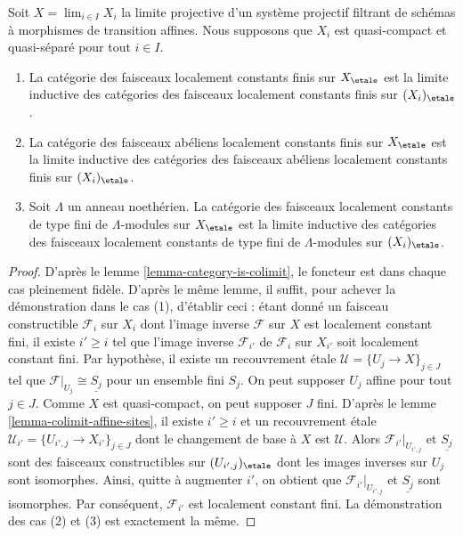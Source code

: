 \begin{lemma}
\label{lemma-category-loc-cst-is-colimit}
Soit $X = \lim_{i \in I} X_i$ la limite projective d'un système
projectif filtrant de schémas à morphismes de transition affines.
Nous supposons que $X_i$ est quasi-compact et quasi-séparé
pour tout $i \in I$.
\begin{enumerate}
\item La catégorie des faisceaux localement constants finis sur $X_\etale$
est la limite inductive des catégories des faisceaux localement constants finis
sur $(X_i)_\etale$.
\item La catégorie des faisceaux abéliens localement constants finis sur $X_\etale$
est la limite inductive des catégories des faisceaux abéliens localement constants finis
sur $(X_i)_\etale$.
\item Soit $\Lambda$ un anneau noethérien. La catégorie des faisceaux
localement constants de type fini de $\Lambda$-modules sur $X_\etale$
est la limite inductive des catégories des faisceaux localement constants
de type fini de $\Lambda$-modules sur $(X_i)_\etale$.
\end{enumerate}
\end{lemma}

\begin{proof}
D'après le lemme \ref{lemma-category-is-colimit}, le foncteur est dans chaque cas
pleinement fidèle. D'après le même lemme, il suffit, pour achever
la démonstration dans le cas (1), d'établir ceci : étant donné un faisceau constructible
$\mathcal{F}_i$ sur $X_i$ dont l'image inverse $\mathcal{F}$ sur $X$ est
localement constant fini, il existe $i' \geq i$ tel que
l'image inverse $\mathcal{F}_{i'}$ de $\mathcal{F}_i$ sur $X_{i'}$
soit localement constant fini. Par hypothèse, il existe un recouvrement \'etale
$\mathcal{U} = \{U_j \to X\}_{j \in J}$
tel que $\mathcal{F}|_{U_j} \cong \underline{S_j}$ pour un ensemble fini $S_j$.
On peut supposer $U_j$ affine pour tout $j \in J$.
Comme $X$ est quasi-compact, on peut supposer $J$ fini.
D'après le lemme \ref{lemma-colimit-affine-sites}, il existe $i' \geq i$
et un recouvrement \'etale $\mathcal{U}_{i'} = \{U_{i', j} \to X_{i'}\}_{j \in J}$
dont le changement de base à $X$ est $\mathcal{U}$. Alors
$\mathcal{F}_{i'}|_{U_{i', j}}$ et $\underline{S_j}$ sont des
faisceaux constructibles sur $(U_{i', j})_\etale$ dont les images inverses sur
$U_j$ sont isomorphes. Ainsi, quitte à augmenter $i'$, on obtient
que $\mathcal{F}_{i'}|_{U_{i', j}}$ et $\underline{S_j}$
sont isomorphes. Par conséquent, $\mathcal{F}_{i'}$ est localement constant fini.
La démonstration des cas (2) et (3) est exactement la même.
\end{proof}

